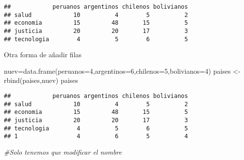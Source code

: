 \documentclass[
]{article}
\newenvironment{Shaded}{\begin{snugshade}}{\end{snugshade}}
\newcommand{\AttributeTok}[1]{\textcolor[rgb]{0.77,0.63,0.00}{#1}}
\newcommand{\CommentTok}[1]{\textcolor[rgb]{0.56,0.35,0.01}{\textit{#1}}}
\newcommand{\DecValTok}[1]{\textcolor[rgb]{0.00,0.00,0.81}{#1}}
\newcommand{\FunctionTok}[1]{\textcolor[rgb]{0.00,0.00,0.00}{#1}}
\newcommand{\NormalTok}[1]{#1}
\newcommand{\OtherTok}[1]{\textcolor[rgb]{0.56,0.35,0.01}{#1}}
\newcommand{\SpecialCharTok}[1]{\textcolor[rgb]{0.00,0.00,0.00}{#1}}
\newcommand{\StringTok}[1]{\textcolor[rgb]{0.31,0.60,0.02}{#1}}
\begin{document}
\begin{Shaded}
\end{Shaded}

\begin{verbatim}
##            peruanos argentinos chilenos bolivianos
## salud            10          4        5          2
## economia         15         48       15          5
## justicia         20         20       17          3
## tecnologia        4          5        6          5
\end{verbatim}

Otra forma de añadir filas

\begin{Shaded}
\begin{Highlighting}[]
\NormalTok{nuev}\OtherTok{=}\FunctionTok{data.frame}\NormalTok{(}\AttributeTok{peruanos=}\DecValTok{4}\NormalTok{,}\AttributeTok{argentinos=}\DecValTok{6}\NormalTok{,}\AttributeTok{chilenos=}\DecValTok{5}\NormalTok{,}\AttributeTok{bolivianos=}\DecValTok{4}\NormalTok{)}
\NormalTok{paises }\OtherTok{\textless{}{-}} \FunctionTok{rbind}\NormalTok{(paises,nuev)}
\NormalTok{paises}
\end{Highlighting}
\end{Shaded}

\begin{verbatim}
##            peruanos argentinos chilenos bolivianos
## salud            10          4        5          2
## economia         15         48       15          5
## justicia         20         20       17          3
## tecnologia        4          5        6          5
## 1                 4          6        5          4
\end{verbatim}

\begin{Shaded}
\begin{Highlighting}[]
\CommentTok{\#Solo tenemos que modificar el nombre}
\end{Highlighting}
\end{Shaded}
\end{document}

